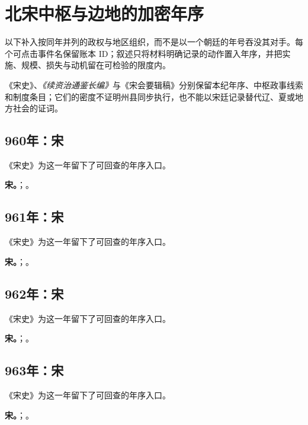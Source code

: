 \section{北宋中枢与边地的加密年序}
以下补入按同年并列的政权与地区组织，而不是以一个朝廷的年号吞没其对手。每个可点击事件名保留账本 ID；叙述只将材料明确记录的动作置入年序，并把实施、规模、损失与动机留在可检验的限度内。

《宋史》、\textit{《续资治通鉴长编》}与《宋会要辑稿》分别保留本纪年序、中枢政事线索和制度条目；它们的密度不证明州县同步执行，也不能以宋廷记录替代辽、夏或地方社会的证词。

\subsection{960年：宋}
《宋史》为这一年留下了可回查的年序入口。

\noindent\textbf{宋。}；。

\subsection{961年：宋}
《宋史》为这一年留下了可回查的年序入口。

\noindent\textbf{宋。}；。

\subsection{962年：宋}
《宋史》为这一年留下了可回查的年序入口。

\noindent\textbf{宋。}；。

\subsection{963年：宋}
《宋史》为这一年留下了可回查的年序入口。

\noindent\textbf{宋。}；。

